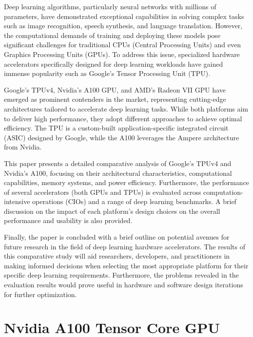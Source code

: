 \documentclass[conference]{IEEEtran}
\begin{document}
    Deep learning algorithms, particularly neural networks with millions of parameters, have demonstrated exceptional capabilities in solving complex tasks such as image recognition, speech synthesis, and language translation.
    However, the computational demands of training and deploying these models pose significant challenges for traditional CPUs (Central Processing Units) and even Graphics Processing Units (GPUs).
    To address this issue, specialized hardware accelerators specifically designed for deep learning workloads have gained immense popularity such as Google's Tensor Processing Unit (TPU).

    Google's TPUv4, Nvidia's A100 GPU, and AMD's Radeon VII GPU have emerged as prominent contenders in the market, representing cutting-edge architectures tailored to accelerate deep learning tasks.
    While both platforms aim to deliver high performance, they adopt different approaches to achieve optimal efficiency.
    The TPU is a custom-built application-specific integrated circuit (ASIC) designed by Google, while the A100 leverages the Ampere architecture from Nvidia.

    This paper presents a detailed comparative analysis of Google's TPUv4 and Nvidia's A100, focusing on their architectural characteristics, computational capabilities, memory systems, and power efficiency.
    Furthermore,
    the performance of several accelerators (both GPUs and TPUs)
    is evaluated across computation-intensive operations (CIOs) and a range of deep learning benchmarks.
    A brief discussion on the impact of each platform's design choices on the overall performance and usability is also provided.

    Finally, the paper is concluded with a brief outline on potential avenues for future research in the field of deep learning hardware accelerators.
    The results of this comparative study will aid researchers, developers,
    and practitioners
    in making informed decisions
    when selecting the most appropriate platform for their specific deep learning requirements.
    Furthermore,
    the problems
    revealed in the evaluation results would prove useful in hardware and software design iterations for further optimization.


    \section{Nvidia A100 Tensor Core GPU}
    \label{sec:nvidia-a100-tensor-core-gpu}
    
\end{document}
